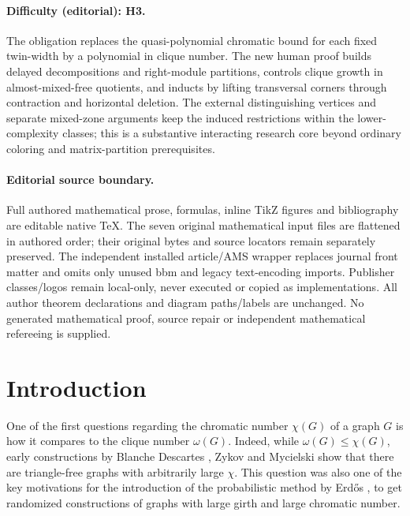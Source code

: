 \documentclass[11pt]{article}
\numberwithin{equation}{section}
\begin{document}
\paragraph{Difficulty (editorial): H3.} The obligation replaces the quasi-polynomial chromatic bound for each fixed twin-width by a polynomial in clique number. The new human proof builds delayed decompositions and right-module partitions, controls clique growth in almost-mixed-free quotients, and inducts by lifting transversal corners through contraction and horizontal deletion. The external distinguishing vertices and separate mixed-zone arguments keep the induced restrictions within the lower-complexity classes; this is a substantive interacting research core beyond ordinary coloring and matrix-partition prerequisites.
\paragraph{Editorial source boundary.} Full authored mathematical prose, formulas, inline TikZ figures and bibliography are editable native TeX. The seven original mathematical input files are flattened in authored order; their original bytes and source locators remain separately preserved. The independent installed article/AMS wrapper replaces journal front matter and omits only unused bbm and legacy text-encoding imports. Publisher classes/logos remain local-only, never executed or copied as implementations. All author theorem declarations and diagram paths/labels are unchanged. No generated mathematical proof, source repair or independent mathematical refereeing is supplied.
\clearpage
\section{Introduction}

One of the first questions regarding the chromatic number $\chi (G)$ of a graph $G$ is how it compares to the clique number $\omega (G)$. Indeed, while $\omega (G)\leq \chi (G)$, early constructions by Blanche Descartes \cite{BD54}, Zykov \cite{ZY52} and Mycielski \cite{MY55} show that there are triangle-free graphs with arbitrarily large $\chi$. This question was also one of the key motivations for the introduction of the probabilistic method by Erd\H{o}s \cite{ER59}, to get randomized constructions of graphs with large girth and large chromatic number.
\end{document}

